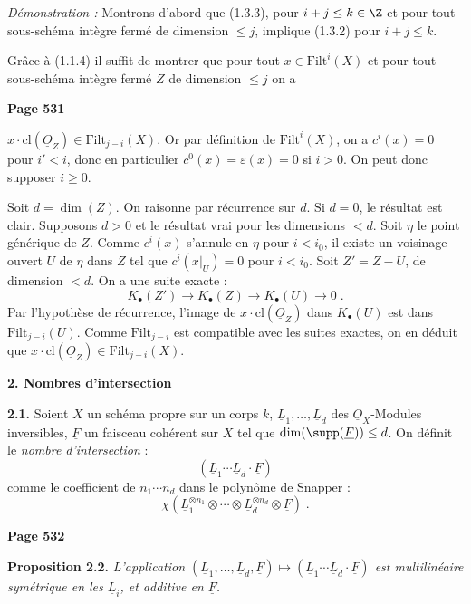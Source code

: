\textit{D\'emonstration :} Montrons d'abord que (1.3.3), pour $i+j \leq k \in \Z$ et pour tout sous-sch\'ema int\`egre ferm\'e de dimension $\leq j$, implique (1.3.2) pour $i + j \leq k$.

Gr\^ace \`a (1.1.4) il suffit de montrer que pour tout $x \in \mathrm{Filt}^i(X)$ et pour tout sous-sch\'ema int\`egre ferm\'e $Z$ de dimension $\leq j$ on a

\newpage
\noindent\textbf{Page 531}

$x \cdot \mathrm{cl}(\underline{O}_Z) \in \mathrm{Filt}_{j-i}(X)$. Or par d\'efinition de $\mathrm{Filt}^i(X)$, on a $c^i(x) = 0$ pour $i' < i$, donc en particulier $c^0(x) = \varepsilon(x) = 0$ si $i > 0$. On peut donc supposer $i \geq 0$.

Soit $d = \dim(Z)$. On raisonne par r\'ecurrence sur $d$. Si $d = 0$, le r\'esultat est clair. Supposons $d > 0$ et le r\'esultat vrai pour les dimensions $< d$. Soit $\eta$ le point g\'en\'erique de $Z$. Comme $c^i(x)$ s'annule en $\eta$ pour $i < i_0$, il existe un voisinage ouvert $U$ de $\eta$ dans $Z$ tel que $c^i(x|_U) = 0$ pour $i < i_0$. Soit $Z' = Z - U$, de dimension $< d$. On a une suite exacte :
\[
K_\bullet(Z') \longrightarrow K_\bullet(Z) \longrightarrow K_\bullet(U) \longrightarrow 0\;.
\]
Par l'hypoth\`ese de r\'ecurrence, l'image de $x \cdot \mathrm{cl}(\underline{O}_Z)$ dans $K_\bullet(U)$ est dans $\mathrm{Filt}_{j-i}(U)$. Comme $\mathrm{Filt}_{j-i}$ est compatible avec les suites exactes, on en d\'eduit que $x \cdot \mathrm{cl}(\underline{O}_Z) \in \mathrm{Filt}_{j-i}(X)$.

\medskip
\noindent\textbf{2. Nombres d'intersection}

\smallskip
\noindent\textbf{2.1.} Soient $X$ un sch\'ema propre sur un corps $k$, $\underline{L}_1, \ldots, \underline{L}_d$ des $\underline{O}_X$-Modules inversibles, $\underline{F}$ un faisceau coh\'erent sur $X$ tel que $\dim(\supp(\underline{F})) \leq d$. On d\'efinit le \textit{nombre d'intersection} :
\[
(\underline{L}_1 \cdots \underline{L}_d \cdot \underline{F})
\]
comme le coefficient de $n_1 \cdots n_d$ dans le polyn\^ome de Snapper :
\[
\chi(\underline{L}_1^{\otimes n_1} \otimes \cdots \otimes \underline{L}_d^{\otimes n_d} \otimes \underline{F})\;.
\]

\newpage
\noindent\textbf{Page 532}

\smallskip
\noindent\textbf{Proposition 2.2.} \textit{L'application $(\underline{L}_1, \ldots, \underline{L}_d, \underline{F}) \mapsto (\underline{L}_1 \cdots \underline{L}_d \cdot \underline{F})$ est multilin\'eaire sym\'etrique en les $\underline{L}_i$, et additive en $\underline{F}$.}

